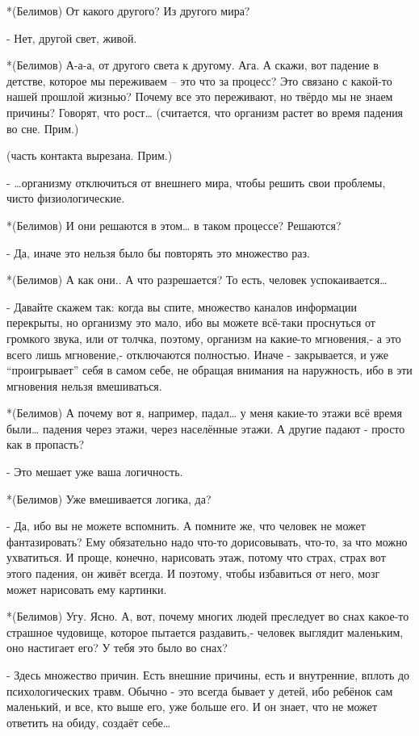 *(Белимов) От какого другого? Из другого мира?

- Нет, другой свет, живой.

*(Белимов) А-а-а, от другого света к другому. Ага.  А скажи, вот падение в детстве, которое мы переживаем – это что за процесс? Это связано с какой-то нашей прошлой жизнью? Почему все это переживают, но твёрдо мы не знаем причины? Говорят, что рост… (считается, что организм растет во время падения во сне. Прим.)

(часть контакта вырезана. Прим.)

- …организму отключиться от внешнего мира, чтобы решить свои проблемы, чисто физиологические.

*(Белимов) И они решаются в этом… в таком процессе? Решаются?

- Да, иначе это нельзя было бы повторять это множество раз.

*(Белимов) А как они.. А что разрешается? То есть, человек успокаивается…

- Давайте скажем так: когда вы спите, множество каналов информации перекрыты, но организму это мало, ибо вы можете всё-таки проснуться от громкого звука, или от толчка, поэтому, организм на какие-то мгновения,-  а это всего лишь мгновение,- отключаются полностью. Иначе - закрывается, и уже “проигрывает” себя в самом себе, не обращая внимания на наружность, ибо в эти мгновения нельзя вмешиваться.

*(Белимов) А почему вот я, например, падал… у меня какие-то этажи всё время были… падения через этажи, через населённые этажи. А другие падают - просто как в пропасть?

- Это мешает уже ваша логичность.

*(Белимов) Уже вмешивается логика, да?

- Да, ибо вы не можете вспомнить. А помните же, что человек не может фантазировать? Ему обязательно надо что-то дорисовывать, что-то, за что можно ухватиться. И проще, конечно, нарисовать этаж, потому что страх, страх вот этого падения, он живёт всегда. И поэтому, чтобы избавиться от него, мозг может нарисовать ему картинки.

*(Белимов) Угу. Ясно. А, вот, почему многих людей преследует во снах какое-то страшное чудовище, которое пытается раздавить,- человек выглядит маленьким, оно настигает его? У тебя это было во снах?

- Здесь множество причин. Есть внешние причины, есть и внутренние, вплоть до психологических травм. Обычно - это всегда бывает у детей, ибо ребёнок сам маленький, и все, кто выше его, уже больше его. И он знает, что не может ответить на обиду, создаёт себе…

